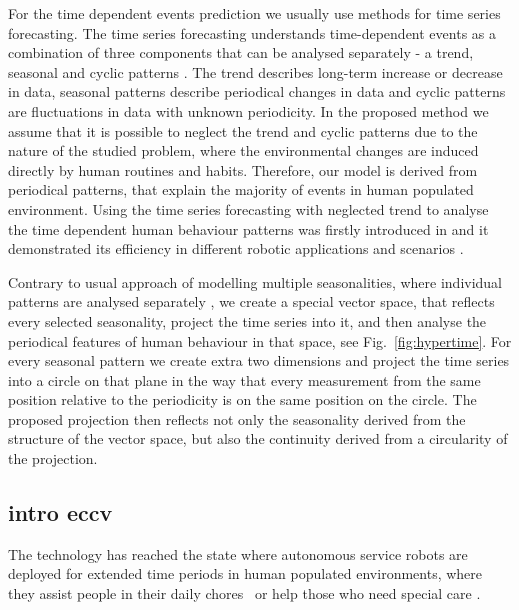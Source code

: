 For the time dependent events prediction we usually use methods for time series forecasting.
The time series forecasting understands time-dependent events as a combination of three components that can be analysed separately - a trend, seasonal and cyclic patterns \cite{hyndman2018forecasting}.
The trend describes long-term increase or decrease in data, seasonal patterns describe periodical changes in data and cyclic patterns are fluctuations in data with unknown periodicity.
In the proposed method we assume that it is possible to neglect the trend and cyclic patterns due to the nature of the studied problem, where the environmental changes are induced directly by human routines and habits.
Therefore, our model is derived from periodical patterns, that explain the majority of events in human populated environment. 
Using the time series forecasting with neglected trend to analyse the time dependent human behaviour patterns was firstly introduced in \cite{krajnik2017fremen} and it demonstrated its efficiency in different robotic applications and scenarios \cite{santos2017spatio,krajnik2015s,santos2016lifelong}.

Contrary to usual approach of modelling multiple seasonalities, where individual patterns are analysed separately \cite{gould2008forecasting}, we create a special vector space, that reflects every selected seasonality, project the time series into it, and then analyse the periodical features of human behaviour in that space, see Fig.~\ref{fig:hypertime}.
For every seasonal pattern we create extra two dimensions and project the time series into a circle on that plane in the way that every measurement from the same position relative to the periodicity is on the same position on the circle.
The proposed projection then reflects not only the seasonality derived from the structure of the vector space, but also the continuity derived from a circularity of the projection.


\subsection{intro eccv}


The technology has reached the state where autonomous service robots are deployed for extended time periods in human populated environments, where they assist people in their daily chores~\cite{hawes2017strands} or help those who need special care \cite{hebesberger2017patterns}. 

